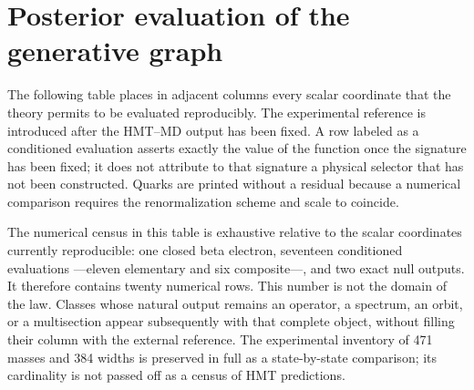 \section{Posterior evaluation of the generative graph}
The following table places in adjacent columns every scalar coordinate that the theory permits to be evaluated reproducibly. The experimental reference is introduced after the HMT--MD output has been fixed. A row labeled as a conditioned evaluation asserts exactly the value of the function once the signature has been fixed; it does not attribute to that signature a physical selector that has not been constructed. Quarks are printed without a residual because a numerical comparison requires the renormalization scheme and scale to coincide.

The numerical census in this table is exhaustive relative to the scalar coordinates currently reproducible: one closed beta electron, seventeen conditioned evaluations ---eleven elementary and six composite---, and two exact null outputs. It therefore contains twenty numerical rows. This number is not the domain of the law. Classes whose natural output remains an operator, a spectrum, an orbit, or a multisection appear subsequently with that complete object, without filling their column with the external reference. The experimental inventory of 471 masses and 384 widths is preserved in full as a state-by-state comparison; its cardinality is not passed off as a census of HMT predictions.

